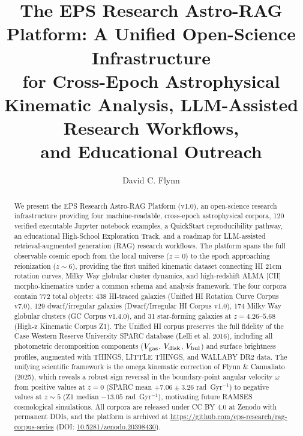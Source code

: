 \documentclass[twocolumn]{aastex631}
\begin{document}
\title{The EPS Research Astro-RAG Platform: A Unified Open-Science Infrastructure\\
for Cross-Epoch Astrophysical Kinematic Analysis, LLM-Assisted Research Workflows,\\
and Educational Outreach}

\author{David C. Flynn}


\begin{abstract}
We present the EPS Research Astro-RAG Platform (v1.0), an open-science research
infrastructure providing four machine-readable, cross-epoch astrophysical corpora,
120 verified executable Jupyter notebook examples, a QuickStart reproducibility
pathway, an educational High-School Exploration Track, and a roadmap for
LLM-assisted retrieval-augmented generation (RAG) research workflows. The platform
spans the full observable cosmic epoch from the local universe ($z = 0$) to the
epoch approaching reionization ($z \sim 6$), providing the first unified
kinematic dataset connecting HI 21cm rotation curves, Milky Way globular cluster
dynamics, and high-redshift ALMA [CII] morpho-kinematics under a common
schema and analysis framework. The four corpora contain 772 total objects:
438 HI-traced galaxies (Unified HI Rotation Curve Corpus v7.0), 129
dwarf/irregular galaxies (Dwarf/Irregular HI Corpus v1.0), 174 Milky Way
globular clusters (GC Corpus v1.4.0), and 31 star-forming galaxies at
$z = 4.26$--$5.68$ (High-z Kinematic Corpus Z1). The Unified HI corpus
preserves the full fidelity of the Case Western Reserve University SPARC
database (Lelli et al. 2016), including all photometric decomposition components
($V_{\rm gas}$, $V_{\rm disk}$, $V_{\rm bul}$) and surface brightness profiles,
augmented with THINGS, LITTLE THINGS, and WALLABY DR2 data. The unifying
scientific framework is the omega kinematic correction of Flynn \& Cannaliato
(2025), which reveals a robust sign reversal in the boundary-point angular
velocity $\omega$ from positive values at $z = 0$ (SPARC mean $+7.06 \pm 3.26$
rad~Gyr$^{-1}$) to negative values at $z \sim 5$ (Z1 median $-13.05$
rad~Gyr$^{-1}$), motivating future RAMSES cosmological simulations. All
corpora are released under CC BY 4.0 at Zenodo with permanent DOIs, and the
platform is archived at \url{https://github.com/eps-research/rag-corpus-series}
(DOI: \href{https://doi.org/10.5281/zenodo.20398430}{10.5281/zenodo.20398430}).
\end{abstract}

\end{document}
